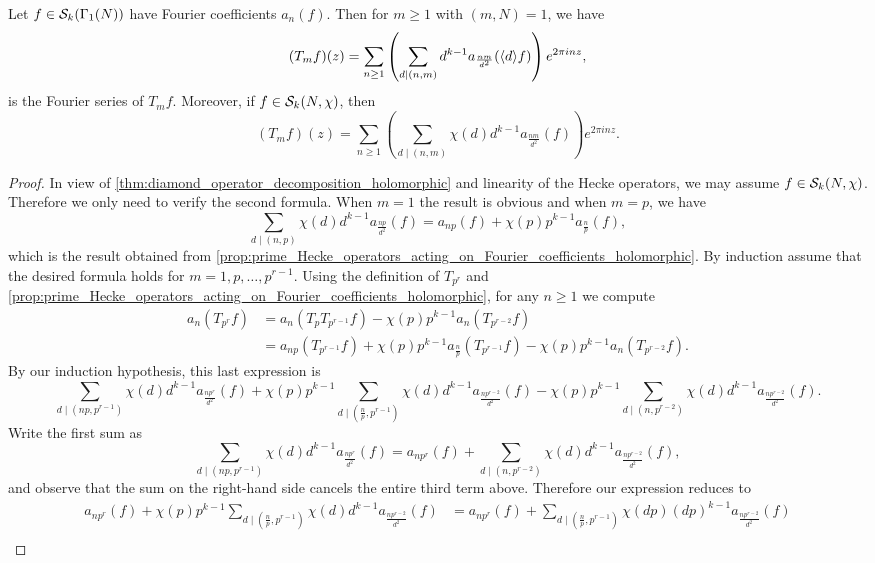     \begin{proposition}\label{prop:general_Hecke_operators_acting_on_Fourier_coefficients_holomorphic}
      Let $f \in \mathcal{S}_{k}(\Gamma_{1}(N))$ have Fourier coefficients $a_{n}(f)$. Then for $m \ge 1$ with $(m,N) = 1$, we have
      \[
        (T_{m}f)(z) = \sum_{n \ge 1}\left(\sum_{d \mid (n,m)}d^{k-1}a_{\frac{nm}{d^{2}}}(\langle d\rangle f)\right)e^{2\pi inz},
      \]
      is the Fourier series of $T_{m}f$. Moreover, if $f \in \mathcal{S}_{k}(N,\chi)$, then
      \[
        (T_{m}f)(z) = \sum_{n \ge 1}\left(\sum_{d \mid (n,m)}\chi(d)d^{k-1}a_{\frac{nm}{d^{2}}}(f)\right)e^{2\pi inz}.
      \]
    \end{proposition}
    \begin{proof}
      In view of \cref{thm:diamond_operator_decomposition_holomorphic} and linearity of the Hecke operators, we may assume $f \in \mathcal{S}_{k}(N,\chi)$. Therefore we only need to verify the second formula. When $m = 1$ the result is obvious and when $m = p$, we have
      \[
        \sum_{d \mid (n,p)}\chi(d)d^{k-1}a_{\frac{np}{d^{2}}}(f) = a_{np}(f)+\chi(p)p^{k-1}a_{\frac{n}{p}}(f),
      \]
      which is the result obtained from \cref{prop:prime_Hecke_operators_acting_on_Fourier_coefficients_holomorphic}. By induction assume that the desired formula holds for $m = 1,p,\ldots,p^{r-1}$. Using the definition of $T_{p^{r}}$ and \cref{prop:prime_Hecke_operators_acting_on_Fourier_coefficients_holomorphic}, for any $n \ge 1$ we compute
      \begin{align*}
        a_{n}(T_{p^{r}}f) &= a_{n}(T_{p}T_{p^{r-1}}f)-\chi(p)p^{k-1}a_{n}(T_{p^{r-2}}f) \\
        &= a_{np}(T_{p^{r-1}}f)+\chi(p)p^{k-1}a_{\frac{n}{p}}(T_{p^{r-1}}f)-\chi(p)p^{k-1}a_{n}(T_{p^{r-2}}f).
      \end{align*}
      By our induction hypothesis, this last expression is
      \[
        \sum_{d \mid (np,p^{r-1})}\chi(d)d^{k-1}a_{\frac{np^{r}}{d^{2}}}(f)+\chi(p)p^{k-1}\sum_{d \mid \left(\frac{n}{p},p^{r-1}\right)}\chi(d)d^{k-1}a_{\frac{np^{r-2}}{d^{2}}}(f)-\chi(p)p^{k-1}\sum_{d \mid (n,p^{r-2})}\chi(d)d^{k-1}a_{\frac{np^{r-2}}{d^{2}}}(f).
      \]
      Write the first sum as
      \[
        \sum_{d \mid (np,p^{r-1})}\chi(d)d^{k-1}a_{\frac{np^{r}}{d^{2}}}(f) = a_{np^{r}}(f)+\sum_{d \mid (n,p^{r-2})}\chi(d)d^{k-1}a_{\frac{np^{r-2}}{d^{2}}}(f),
      \]
      and observe that the sum on the right-hand side cancels the entire third term above. Therefore our expression reduces to
      \begin{align*}
        a_{np^{r}}(f)+\chi(p)p^{k-1}\sum_{d \mid \left(\frac{n}{p},p^{r-1}\right)}\chi(d)d^{k-1}a_{\frac{np^{r-2}}{d^{2}}}(f) &= a_{np^{r}}(f)+\sum_{d \mid \left(\frac{n}{p},p^{r-1}\right)}\chi(dp)(dp)^{k-1}a_{\frac{np^{r-2}}{d^{2}}}(f) \\

\end{align*}
\end{proof}
